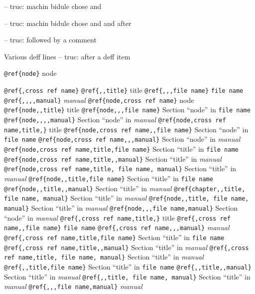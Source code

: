 \documentclass{book}
\begin{document}
%
\hbox{}-- truc: machin bidule chose and 


%
\hbox{}-- truc: machin bidule chose and and after


%
\hbox{}-- truc: followed by a comment


%
Various deff lines
\hbox{}-- truc: after a deff item


%

\texttt{@ref\{node\}} node

\texttt{@ref\{,cross ref name\}} 
\texttt{@ref\{,,title\}} title
\texttt{@ref\{,,,file name\}} \texttt{file name}
\texttt{@ref\{,,,,manual\}} \textit{manual}
\texttt{@ref\{node,cross ref name\}} node
\texttt{@ref\{node,,title\}} title
\texttt{@ref\{node,,,file name\}} Section ``node'' in \texttt{file name}
\texttt{@ref\{node,,,,manual\}} Section ``node'' in \textit{manual}
\texttt{@ref\{node,cross ref name,title,\}} title
\texttt{@ref\{node,cross ref name,,file name\}} Section ``node'' in \texttt{file name}
\texttt{@ref\{node,cross ref name,,,manual\}} Section ``node'' in \textit{manual}
\texttt{@ref\{node,cross ref name,title,file name\}} Section ``title'' in \texttt{file name}
\texttt{@ref\{node,cross ref name,title,,manual\}} Section ``title'' in \textit{manual}
\texttt{@ref\{node,cross ref name,title, file name, manual\}} Section ``title'' in \textit{manual}
\texttt{@ref\{node,,title,file name\}} Section ``title'' in \texttt{file name}
\texttt{@ref\{node,,title,,manual\}} Section ``title'' in \textit{manual}
\texttt{@ref\{chapter,,title, file name, manual\}} Section ``title'' in \textit{manual}
\texttt{@ref\{node,,title, file name, manual\}} Section ``title'' in \textit{manual}
\texttt{@ref\{node,,,file name,manual\}} Section ``node'' in \textit{manual}
\texttt{@ref\{,cross ref name,title,\}} title
\texttt{@ref\{,cross ref name,,file name\}} \texttt{file name}
\texttt{@ref\{,cross ref name,,,manual\}} \textit{manual}
\texttt{@ref\{,cross ref name,title,file name\}} Section ``title'' in \texttt{file name}
\texttt{@ref\{,cross ref name,title,,manual\}} Section ``title'' in \textit{manual}
\texttt{@ref\{,cross ref name,title, file name, manual\}} Section ``title'' in \textit{manual}
\texttt{@ref\{,,title,file name\}} Section ``title'' in \texttt{file name}
\texttt{@ref\{,,title,,manual\}} Section ``title'' in \textit{manual}
\texttt{@ref\{,,title, file name, manual\}} Section ``title'' in \textit{manual}
\texttt{@ref\{,,,file name,manual\}} \textit{manual}
\end{document}
